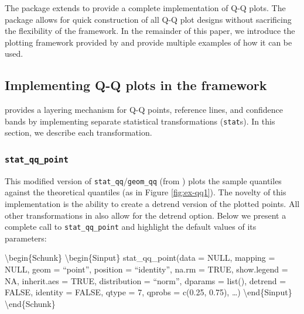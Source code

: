 The  package extends  to provide a complete
implementation of Q-Q plots. The package allows for quick construction
of all Q-Q plot designs without sacrificing the flexibility of the
 framework. In the remainder of this paper, we introduce
the plotting framework provided by  and provide multiple
examples of how it can be used.

\hypertarget{implementing-q-q-plots-in-the-framework}{%
\subsection{\texorpdfstring{Implementing Q-Q plots in the 
framework}{Implementing Q-Q plots in the  framework}}\label{implementing-q-q-plots-in-the-framework}}

\label{sec:implementing}

 provides a  layering mechanism for Q-Q
points, reference lines, and confidence bands by implementing separate
statistical transformations (\texttt{stat}s). In this section, we
describe each transformation.

\hypertarget{stat_qq_point}{%
\subsubsection{\texorpdfstring{\texttt{stat\_qq\_point}}{stat\_qq\_point}}\label{stat_qq_point}}

This modified version of \texttt{stat\_qq}/\texttt{geom\_qq} (from
) plots the sample quantiles against the theoretical
quantiles (as in Figure \ref{fig:ex-qq1}). The novelty of this
implementation is the ability to create a detrend version of the plotted
points. All other transformations in  also allow for the
detrend option. Below we present a complete call to
\texttt{stat\_qq\_point} and highlight the default values of its
parameters:

\textbackslash{}begin\{Schunk\} \textbackslash{}begin\{Sinput\}
stat\_qq\_point(data = NULL, mapping = NULL, geom = ``point'', position
= ``identity'', na.rm = TRUE, show.legend = NA, inherit.aes = TRUE,
distribution = ``norm'', dparams = list(), detrend = FALSE, identity =
FALSE, qtype = 7, qprobs = c(0.25, 0.75), \ldots{})
\textbackslash{}end\{Sinput\} \textbackslash{}end\{Schunk\}

